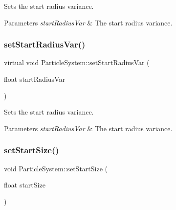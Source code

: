 Sets the start radius variance.


\begin{DoxyParams}{Parameters}
{\em start\+Radius\+Var} & The start radius variance. \\
\hline
\end{DoxyParams}
\mbox{\label{classParticleSystem_a7a16cb772b67e2f1cf5554692bbe6bc0}} 
\subsubsection{\texorpdfstring{set\+Start\+Radius\+Var()}{setStartRadiusVar()}\hspace{0.1cm}{\footnotesize\ttfamily [2/2]}}
{\footnotesize\ttfamily virtual void Particle\+System\+::set\+Start\+Radius\+Var (\begin{DoxyParamCaption}\item[{float}]{start\+Radius\+Var }\end{DoxyParamCaption})\hspace{0.3cm}{\ttfamily [virtual]}}

Sets the start radius variance.


\begin{DoxyParams}{Parameters}
{\em start\+Radius\+Var} & The start radius variance. \\
\hline
\end{DoxyParams}
\mbox{\label{classParticleSystem_a4a45431269256ddc1240da2771bdbd51}} 
\subsubsection{\texorpdfstring{set\+Start\+Size()}{setStartSize()}\hspace{0.1cm}{\footnotesize\ttfamily [1/2]}}
{\footnotesize\ttfamily void Particle\+System\+::set\+Start\+Size (\begin{DoxyParamCaption}\item[{float}]{start\+Size }\end{DoxyParamCaption})\hspace{0.3cm}{\ttfamily [inline]}}

